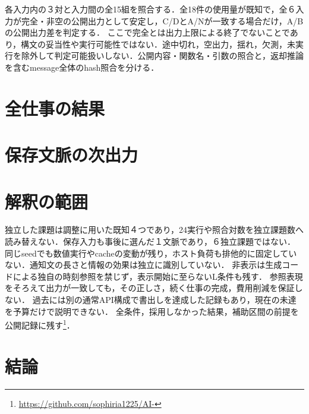 \documentclass[uplatex,a4paper,twocolumn,10pt]{jsarticle}
\begin{document}
各入力内の３対と入力間の全15組を照合する．全18件の使用量が既知で，全６入力が完全・非空の公開出力として安定し，C/DとA/Nが一致する場合だけ，A/Bの公開出力差を判定する．
ここで完全とは出力上限による終了でないことであり，構文の妥当性や実行可能性ではない．途中切れ，空出力，揺れ，欠測，未実行を除外して判定可能扱いしない．公開内容・関数名・引数の照合と，返却推論を含むmessage全体のhash照合を分ける．

\section{全仕事の結果}





\section{保存文脈の次出力}


\section{解釈の範囲}
独立した課題は調整に用いた既知４つであり，24実行や照合対数を独立課題数へ読み替えない．保存入力も事後に選んだ１文脈であり，６独立課題ではない．
同じseedでも数値実行やcacheの変動が残り，ホスト負荷も排他的に固定していない．通知文の長さと情報の効果は独立に識別していない．
非表示は生成コードによる独自の時刻参照を禁じず，表示開始に至らないL条件も残す．
参照表現をそろえて出力が一致しても，その正しさ，続く仕事の完成，費用削減を保証しない．
過去には別の通常API構成で書出しを達成した記録もあり，現在の未達を予算だけで説明できない．
全条件，採用しなかった結果，補助区間の前提を公開記録に残す\footnote{\url{https://github.com/sophiria1225/AI-}}．

\section{結論}

\end{document}
